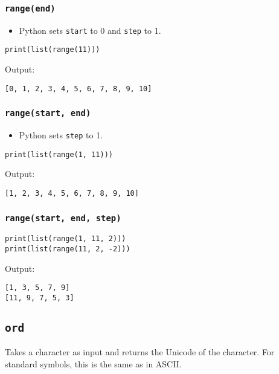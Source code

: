 \documentclass[11pt]{article}
\begin{document}
\subsubsection{\texttt{range(end)}}
\label{sec:orgab96e4e}
\begin{itemize}
\item Python sets \texttt{start} to 0 and \texttt{step} to 1.
\end{itemize}

\begin{verbatim}
print(list(range(11)))
\end{verbatim}

 \noindent Output:

\begin{verbatim}
[0, 1, 2, 3, 4, 5, 6, 7, 8, 9, 10]
\end{verbatim}

\subsubsection{\texttt{range(start, end)}}
\label{sec:orgb72b473}
\begin{itemize}
\item Python sets \texttt{step} to 1.
\end{itemize}

\begin{verbatim}
print(list(range(1, 11)))
\end{verbatim}

 \noindent Output:

\begin{verbatim}
[1, 2, 3, 4, 5, 6, 7, 8, 9, 10]
\end{verbatim}

\subsubsection{\texttt{range(start, end, step)}}
\label{sec:orgd8b8a6b}

\begin{verbatim}
print(list(range(1, 11, 2)))
print(list(range(11, 2, -2)))
\end{verbatim}

 \noindent Output:

\begin{verbatim}
[1, 3, 5, 7, 9]
[11, 9, 7, 5, 3]
\end{verbatim}

\subsection{\texttt{ord}}
\label{sec:org20a4728}
Takes a character as input and returns the Unicode of the character. For standard symbols, this is the same as in ASCII.
\end{document}
